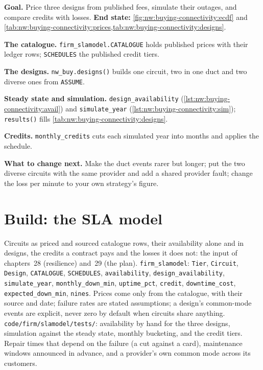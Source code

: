 \begin{tutorial}
\textbf{Goal.} Price three designs from published fees, simulate their outages, and compare credits with losses.
\textbf{End state:} \cref{fig:nw:buying-connectivity:ecdf} and \cref{tab:nw:buying-connectivity:prices,tab:nw:buying-connectivity:designs}.
\begin{tutsteps}
\item \textbf{The catalogue.} \texttt{firm\_slamodel.CATALOGUE} holds published prices with their ledger rows; \texttt{SCHEDULES} the published
  credit tiers.
\item \textbf{The designs.} \texttt{nw\_buy.designs()} builds one circuit, two in one duct and two diverse ones from \texttt{ASSUME}.
\item \textbf{Steady state and simulation.} \texttt{design\_availability} (\cref{lst:nw:buying-connectivity:avail}) and \texttt{simulate\_year}
  (\cref{lst:nw:buying-connectivity:sim}); \texttt{results()} fills \cref{tab:nw:buying-connectivity:designs}.
\item \textbf{Credits.} \texttt{monthly\_credits} cuts each simulated year into months and applies the schedule.
\end{tutsteps}
\textbf{What to change next.} Make the duct events rarer but longer; put the two diverse circuits with the same provider and add a shared
provider fault; change the loss per minute to your own strategy's figure.
\end{tutorial}

\section{Build: the SLA model}\label{bld:nw:buying-connectivity:slamodel}

\begin{build}
 Circuits as priced and sourced catalogue rows, their availability alone and in designs, the credits a contract pays and the losses it
does not: the input of chapters~28 (resilience) and~29 (the plan).
 \texttt{firm\_slamodel}: \texttt{Tier}, \texttt{Circuit}, \texttt{Design}, \texttt{CATALOGUE}, \texttt{SCHEDULES},
\texttt{availability}, \texttt{design\_availability}, \texttt{simulate\_year}, \texttt{monthly\_down\_min}, \texttt{uptime\_pct}, \texttt{credit},
\texttt{downtime\_cost}, \texttt{expected\_down\_min}, \texttt{nines}.
 Prices come only from the catalogue, with their source and date; failure rates are stated assumptions; a design's common-mode events
are explicit, never zero by default when circuits share anything.
 \texttt{code/firm/slamodel/tests/}: availability by hand for the three designs, simulation against the steady state,
monthly bucketing, and the credit tiers.
 Repair times that depend on the failure (a cut against a card), maintenance windows announced in advance, and a provider's own
common mode across its customers.
\end{build}

